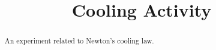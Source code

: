 \documentclass{ximera}
\title{Cooling Activity}
\begin{document}
\begin{abstract}
An experiment related to Newton's cooling law.
\end{abstract}

\maketitle
\end{document}
